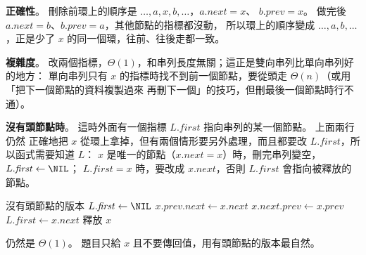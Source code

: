 \begin{pastsoln}
\textbf{正確性}。 刪除前環上的順序是 $\ldots, a, x, b, \ldots$，$a.\mathit{next} = x$、
$b.\mathit{prev} = x$。 做完後 $a.\mathit{next} = b$、$b.\mathit{prev} = a$，其他節點的指標都沒動，
所以環上的順序變成 $\ldots, a, b, \ldots$，正是少了 $x$ 的同一個環，往前、往後走都一致。

\textbf{複雜度}。 改兩個指標，$\Theta(1)$，和串列長度無關；這正是雙向串列比單向串列好的地方：
單向串列只有 $x$ 的指標時找不到前一個節點，要從頭走 $\Theta(n)$（或用「把下一個節點的資料複製過來
再刪下一個」的技巧，但刪最後一個節點時行不通）。

\textbf{沒有頭節點時}。 這時外面有一個指標 $L.\mathit{first}$ 指向串列的某一個節點。 上面兩行仍然
正確地把 $x$ 從環上拿掉，但有兩個情形要另外處理，而且都要改 $L.\mathit{first}$，所以函式需要知道 $L$：
$x$ 是唯一的節點（$x.\mathit{next} = x$）時，刪完串列變空，$L.\mathit{first} \gets \NIL$；
$L.\mathit{first} = x$ 時，要改成 $x.\mathit{next}$，否則 $L.\mathit{first}$ 會指向被釋放的節點。
\begin{pseudo}{沒有頭節點的版本}
     
        \State $L.\mathit{first} \gets \NIL$
    \Else
        \State $x.\mathit{prev}.\mathit{next} \gets x.\mathit{next}$
        \State $x.\mathit{next}.\mathit{prev} \gets x.\mathit{prev}$
            \State $L.\mathit{first} \gets x.\mathit{next}$
        \EndIf
    \EndIf
    \State 釋放 $x$
\EndProcedure
\end{pseudo}
仍然是 $\Theta(1)$。 題目只給 $x$ 且不要傳回值，用有頭節點的版本最自然。
\end{pastsoln}
